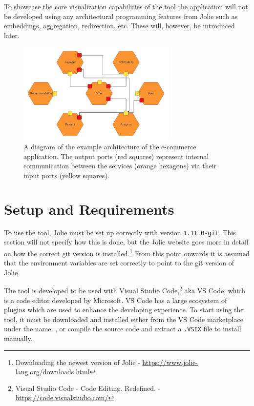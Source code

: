 To showcase the core visualization capabilities of the tool the application will not be developed using any architectural programming features from Jolie such as embeddings, aggregation, redirection, etc.
These will, however, be introduced later.

\begin{figure}[t]
    \center
    \includegraphics[width=0.70\textwidth]{figures/full_example_lc.png}
    \caption{A diagram of the example architecture of the e-commerce application. The output ports (red squares) represent internal communication between the services (orange hexagons) via their input ports (yellow squares).}
    \label{figure:full_example_lc}
\end{figure}

\section{Setup and Requirements}
To use the tool, Jolie must be set up correctly with version \texttt{1.11.0-git}. This section will not specify how this is done, but the Jolie website goes more in detail on how
the correct git version is installed.\footnote{Downloading the newest version of Jolie - \url{https://www.jolie-lang.org/downloads.html}} From this point onwards it is assumed that the environment variables are set correctly to point to the git version of Jolie.

The tool is developed to be used with Visual Studio Code,\footnote{Visual Studio Code - Code Editing. Redefined. - \url{https://code.visualstudio.com/}} aka VS Code, which is a code editor developed by Microsoft.
VS Code has a large ecosystem of plugins which are used to enhance the developing experience.
To start using the tool, it must be downloaded and installed either from the VS Code marketplace under the name: \texttt{\toolname}, or compile the source code and extract a \texttt{.VSIX} file to install manually.

